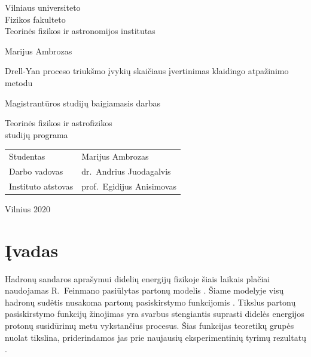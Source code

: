 \documentclass[a4paper, 12pt, oneside]{article}
\begin{document}

\begin{titlepage}
\centering
{\large Vilniaus universiteto \\ Fizikos fakulteto \\ Teorinės fizikos ir astronomijos institutas \par}
\vspace{3.5cm}
{\Large Marijus Ambrozas \par}
\vspace{0.3cm}
{\Large Drell-Yan proceso triukšmo įvykių skaičiaus įvertinimas klaidingo atpažinimo metodu\par}
\vspace{0.8cm}
{\large Magistrantūros studijų baigiamasis darbas \par}
\vspace{0.8cm}
{\large Teorinės fizikos ir astrofizikos \\ studijų programa \par}
\vspace{3.5cm}
{\large \begin{tabular*}{0.9\textwidth}{@{\extracolsep{\fill}}ll}
Studentas & Marijus Ambrozas\tabularnewline[0.5cm]
Darbo vadovas & dr.\ Andrius Juodagalvis\tabularnewline[0.5cm]
Instituto atstovas & prof.\ Egidijus Anisimovas\tabularnewline[0.5cm]
\end{tabular*} \par}
\vspace{4cm}
{\large Vilnius $2020$\par}
\end{titlepage}


\clearpage
\addtocounter{page}{1}
\tableofcontents
\clearpage

\section*{Įvadas} 
Hadronų sandaros aprašymui didelių energijų fizikoje šiais laikais plačiai naudojamas R.\ Feinmano pasiūlytas
partonų modelis \cite{FeynPartons}.
Šiame modelyje visų hadronų sudėtis nusakoma partonų pasiskirstymo funkcijomis \cite{BjorkPartons}.
Tikslus partonų pasiskirstymo funkcijų žinojimas yra svarbus stengiantis suprasti didelės energijos protonų susidūrimų
metu vykstančius procesus.
Šias funkcijas teoretikų grupės nuolat tikslina, priderindamos jas prie naujausių eksperimentinių tyrimų rezultatų
\cite{PDF_MMHT2015, PDF_CJ15, NNPDF, PDF_ABMP16, PDF_MMHT2019, CTEQ2019}.
\end{document}
